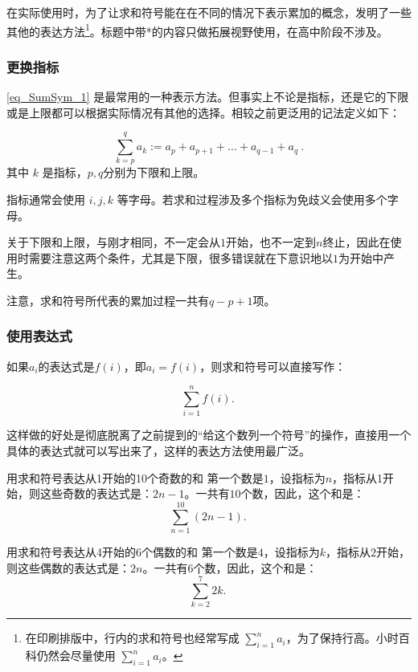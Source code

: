 在实际使用时，为了让求和符号能在在不同的情况下表示累加的概念，发明了一些其他的表达方法\footnote{在印刷排版中，行内的求和符号也经常写成 $\sum_{i=1}^n a_i$，为了保持行高。小时百科仍然会尽量使用 $\sum\limits_{i=1}^n a_i$。}。标题中带*的内容只做拓展视野使用，在高中阶段不涉及。

\subsubsection{更换指标}

\autoref{eq_SumSym_1} 是最常用的一种表示方法。但事实上不论是指标，还是它的下限或是上限都可以根据实际情况有其他的选择。相较之前更泛用的记法定义如下：

\begin{equation}
\sum_{k=p}^q a_k := a_p + a_{p+1} + \dots +a_{q-1}+ a_q~.
\end{equation}
其中 $k$ 是指标，$p,q$分别为下限和上限。

指标通常会使用 $i,j,k$ 等字母。若求和过程涉及多个指标为免歧义会使用多个字母。

关于下限和上限，与刚才相同，不一定会从$1$开始，也不一定到$n$终止，因此在使用时需要注意这两个条件，尤其是下限，很多错误就在下意识地以$1$为开始中产生。

注意，求和符号所代表的累加过程一共有$q-p+1$项。

\subsubsection{使用表达式}

如果$a_i$的表达式是$f(i)$，即$a_i=f(i)$，则求和符号可以直接写作：

\begin{equation}
\sum_{i=1}^n f(i) .~
\end{equation}

这样做的好处是彻底脱离了之前提到的“给这个数列一个符号”的操作，直接用一个具体的表达式就可以写出来了，这样的表达方法使用最广泛。

\begin{example}
{用求和符号表达从1开始的10个奇数的和}
第一个数是$1$，设指标为$n$，指标从1开始，则这些奇数的表达式是：$2n-1$。一共有$10$个数，因此，这个和是：
$$\sum_{n=1}^{10}(2n-1).~$$
\end{example}

\begin{example}
{用求和符号表达从4开始的6个偶数的和}
第一个数是$4$，设指标为$k$，指标从$2$开始，则这些偶数的表达式是：$2n$。一共有$6$个数，因此，这个和是：
$$\sum_{k=2}^{7}{2k} .~$$
\end{example}

